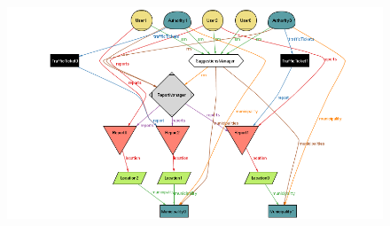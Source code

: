 \begin{itemize}
        \begin{figure}[h]
            \centering
            \advance\leftskip-2cm
            \includegraphics[scale=0.6]{Images/alloy_suggestions.png}
        \end{figure}
        
        \vspace{30px}
    
    
    \end{itemize}